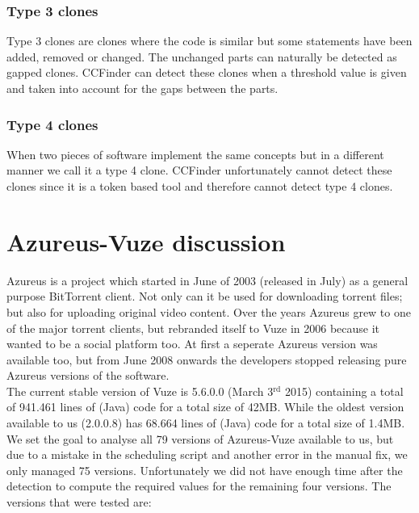 \documentclass[a4paper,twoside,11pt]{article}
\begin{document}
\subsubsection{Type 3 clones}
\label{sec:type3}
Type 3 clones are clones where the code is similar but some statements have been added, removed or changed. The unchanged parts can naturally be detected as gapped clones. CCFinder can detect these clones when a threshold value is given and taken into account for the gaps between the parts.

\subsubsection{Type 4 clones}
\label{sec:type4}
When two pieces of software implement the same concepts but in a different manner we call it a type 4 clone. CCFinder unfortunately cannot detect these clones since it is a token based tool and therefore cannot detect type 4 clones.


\section{Azureus-Vuze discussion}
\label{sec:azureusdiscussion}
{\sc Azureus} is a project which started in June of 2003 (released in July) as a general purpose BitTorrent client. Not only can it be used for downloading torrent files; but also for uploading original video content. Over the years Azureus grew to one of the major torrent clients, but rebranded itself to {\sc Vuze} in 2006 because it wanted to be a social platform too. At first a seperate Azureus version was available too, but from June 2008 onwards the developers stopped releasing pure Azureus versions of the software.  \\

The current stable version of {\sc Vuze} is 5.6.0.0 (March 3$^{\text{rd}}$ 2015) containing a total of 941.461 lines of (Java) code for a total size of 42MB. While the oldest version available to us (2.0.0.8) has 68.664 lines of (Java) code for a total size of 1.4MB. \\

We set the goal to analyse all 79 versions of {\sc Azureus-Vuze} available to us, but due to a mistake in the scheduling script and another error in the manual fix, we only managed 75 versions. Unfortunately we did not have enough time after the detection to compute the required values for the remaining four versions. The versions that were tested are: \\
\end{document}
